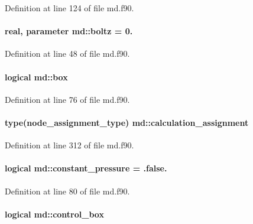 Definition at line 124 of file md.\-f90.

\hypertarget{classmd_ae6fcbf197badd98da838c88da3c0ba6e}{
\paragraph[{boltz}]{\setlength{\rightskip}{0pt plus 5cm}real, parameter md\-::boltz = 0.}}\label{classmd_ae6fcbf197badd98da838c88da3c0ba6e}


Definition at line 48 of file md.\-f90.

\hypertarget{classmd_a7476f44216dc80dd7ddcc80d0a3bcbbd}{
\paragraph[{box}]{\setlength{\rightskip}{0pt plus 5cm}logical md\-::box}}\label{classmd_a7476f44216dc80dd7ddcc80d0a3bcbbd}


Definition at line 76 of file md.\-f90.

\hypertarget{classmd_a07e79a91529355df9df5700e3c691152}{
\paragraph[{calculation\-\_\-assignment}]{\setlength{\rightskip}{0pt plus 5cm}type(node\-\_\-assignment\-\_\-type) md\-::calculation\-\_\-assignment}}\label{classmd_a07e79a91529355df9df5700e3c691152}


Definition at line 312 of file md.\-f90.

\hypertarget{classmd_ae93d83361cefab11ecaadabb651a18ca}{
\paragraph[{constant\-\_\-pressure}]{\setlength{\rightskip}{0pt plus 5cm}logical md\-::constant\-\_\-pressure = .false.}}\label{classmd_ae93d83361cefab11ecaadabb651a18ca}


Definition at line 80 of file md.\-f90.

\hypertarget{classmd_aafecad42c4f7d4a9ad67d52e744a087b}{
\paragraph[{control\-\_\-box}]{\setlength{\rightskip}{0pt plus 5cm}logical md\-::control\-\_\-box}}\label{classmd_aafecad42c4f7d4a9ad67d52e744a087b}


